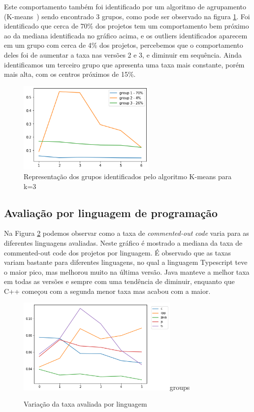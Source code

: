 \documentclass[12pt]{article}
\begin{document}
Este comportamento também foi identificado por um algoritmo de agrupamento (K-means~\cite{hamerly2004learning})
sendo encontrado 3 grupos, como pode ser observado na figura \ref{fig:groups}.
Foi identificado que cerca de 70\% dos projetos tem um comportamento bem próximo ao
da mediana identificada no gráfico acima, e os outliers identificados aparecem em um
grupo com cerca de 4\% dos projetos, percebemos que o comportamento deles foi de aumentar
a taxa nas versões 2 e 3, e diminuir em sequência. Ainda identificamos um terceiro grupo
que apresenta uma taxa mais constante, porém mais alta, com os centros próximos de 15\%.

\begin{figure}[ht]
  \centering
  \includegraphics[width=0.6\textwidth]{../images/groups.png}
  \caption{Representação dos grupos identificados pelo algoritmo K-means para k=3}
  \label{fig:groups}
\end{figure}


\subsection{Avaliação por linguagem de programação}

Na Figura \ref{fig:lang} podemos observar como a taxa de \textit{commented-out code}
varia para as diferentes linguagens avaliadas. Neste gráfico é mostrado a mediana da taxa
de commented-out code dos projetos por linguagem. É observado que as taxas variam bastante
para diferentes linguagens, no qual a linguagem Typescript teve o maior pico, mas melhorou
muito na última versão. Java manteve a melhor taxa em todas as versões e sempre com uma
tendência de diminuir, enquanto que C++ começou com a segunda menor taxa mas acabou com a maior.

\begin{figure}[ht]
  \centering
  \includegraphics[width=0.7\textwidth]{../images/by_language.png}groups
  \caption{Variação da taxa avaliada por linguagem}
  \label{fig:lang}
\end{figure}
\end{document}
